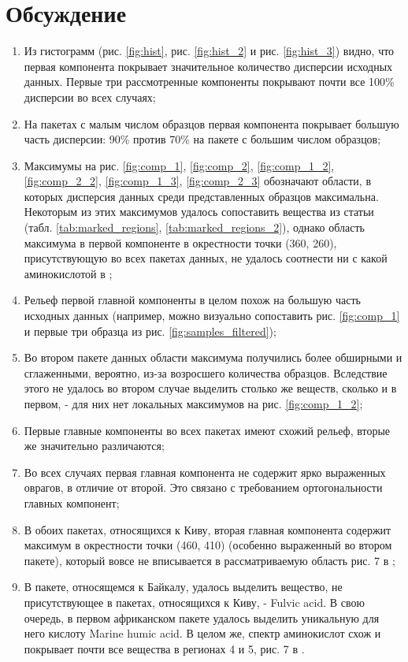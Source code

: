 \documentclass[a4paper]{article}
\begin{document}
\section{Обсуждение}
\begin{enumerate}
    \item Из гистограмм (рис. \ref{fig:hist}, рис. \ref{fig:hist_2} и рис. \ref{fig:hist_3}) видно, что первая компонента покрывает значительное количество дисперсии исходных данных. Первые три рассмотренные компоненты покрывают почти все 100\% дисперсии во всех случаях;
    \item На пакетах с малым числом образцов первая компонента покрывает большую часть дисперсии: 90\% против 70\% на пакете с большим числом образцов;
    \item Максимумы на рис. \ref{fig:comp_1}, \ref{fig:comp_2}, \ref{fig:comp_1_2}, \ref{fig:comp_2_2}, \ref{fig:comp_1_3}, \ref{fig:comp_2_3} обозначают области, в которых дисперсия данных среди  представленных образцов максимальна. Некоторым из этих максимумов удалось сопоставить вещества  из статьи \cite{article1} (табл. \ref{tab:marked_regions}, \ref{tab:marked_regions_2}), однако область максимума в первой компоненте в окрестности точки (360, 260), присутствующую во всех пакетах данных, не удалось соотнести ни с какой аминокислотой в \cite{article1};
    \item Рельеф первой главной компоненты в целом похож на большую часть исходных данных (например, можно визуально сопоставить рис. \ref{fig:comp_1} и первые три образца из рис. \ref{fig:samples_filtered});
    \item Во втором пакете данных области максимума получились более обширными и сглаженными, вероятно, из-за возросшего количества образцов. Вследствие этого не удалось во втором случае выделить столько же веществ, сколько и в первом, - для них нет локальных максимумов на рис. \ref{fig:comp_1_2};
    \item Первые главные компоненты во всех пакетах имеют схожий рельеф, вторые же значительно различаются;
    \item Во всех случаях первая главная компонента не содержит ярко выраженных оврагов, в отличие от второй. Это связано с требованием ортогональности главных компонент;
    \item В обоих пакетах, относящихся к Киву, вторая главная компонента содержит максимум в окрестности точки (460, 410) (особенно выраженный во втором пакете), который вовсе не вписывается в рассматриваемую область рис. 7 в \cite{article1};
    \item В пакете, относящемся к Байкалу, удалось выделить вещество, не присутствующее в пакетах, относящихся к Киву, - Fulvic acid. В свою очередь, в первом африканском пакете удалось выделить уникальную для него кислоту Marine humic acid. В целом же, спектр аминокислот схож и покрывает почти все вещества в регионах 4 и 5, рис. 7 в \cite{article1}.
\end{enumerate}
\end{document}

